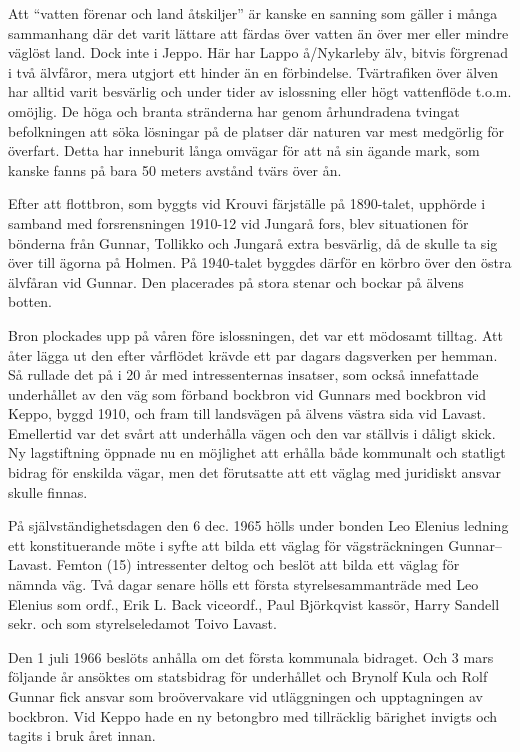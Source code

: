 
Att ``vatten förenar och land åtskiljer'' är kanske en sanning som gäller i många sammanhang där det varit lättare att färdas över vatten än över mer eller mindre väglöst land. Dock inte i Jeppo. Här har Lappo å/Nykarleby älv, bitvis förgrenad i två älvfåror, mera utgjort ett hinder än en förbindelse. Tvärtrafiken över älven har alltid varit besvärlig och under tider av islossning eller högt vattenflöde t.o.m. omöjlig. De höga och branta stränderna har genom århundradena tvingat befolkningen att söka lösningar på de platser där naturen var mest medgörlig för överfart. Detta har inneburit långa omvägar för att nå sin ägande mark, som kanske fanns på bara 50 meters avstånd tvärs över ån.

Efter att flottbron, som byggts vid Krouvi färjställe på 1890-talet, upphörde i samband med forsrensningen 1910-12 vid Jungarå fors, blev situationen för bönderna från Gunnar, Tollikko och Jungarå extra besvärlig, då de skulle ta sig över till ägorna på Holmen. På 1940-talet byggdes därför en körbro över den östra älvfåran vid Gunnar. Den placerades på stora stenar och bockar på älvens botten.

Bron plockades upp på våren före islossningen, det var ett mödosamt tilltag. Att åter lägga ut den efter vårflödet krävde ett par dagars dagsverken per hemman. Så rullade det på i 20 år med intressenternas insatser, som också innefattade underhållet av den väg som förband bockbron vid Gunnars med bockbron vid Keppo, byggd 1910, och fram till landsvägen på älvens västra sida vid Lavast. Emellertid var det svårt att underhålla vägen och den var ställvis i dåligt skick. Ny lagstiftning öppnade nu en möjlighet att erhålla både kommunalt och statligt bidrag för enskilda vägar, men det förutsatte att ett väglag med juridiskt ansvar skulle finnas.

På självständighetsdagen den 6 dec. 1965 hölls under bonden Leo Elenius ledning ett konstituerande möte i syfte att bilda ett väglag för vägsträckningen Gunnar--Lavast. Femton (15) intressenter deltog och beslöt att bilda ett väglag för nämnda väg. Två dagar senare hölls ett första styrelsesammanträde med Leo Elenius som ordf., Erik L. Back viceordf., Paul Björkqvist kassör, Harry Sandell sekr. och som styrelseledamot Toivo Lavast.

Den 1 juli 1966 beslöts anhålla om det första kommunala bidraget. Och 3 mars följande år ansöktes om statsbidrag för underhållet och Brynolf Kula och Rolf Gunnar fick ansvar som broövervakare vid utläggningen och upptagningen av bockbron. Vid Keppo hade en ny betongbro med tillräcklig bärighet invigts och tagits i bruk året innan.

